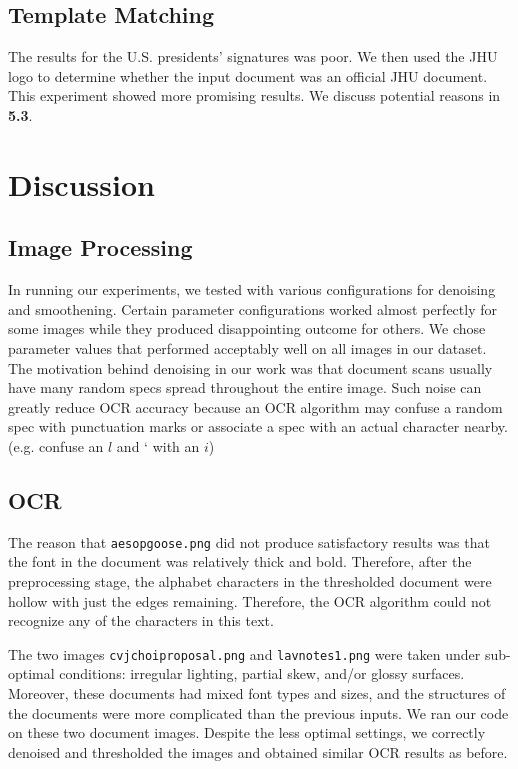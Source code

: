 \documentclass[11pt,letterpaper]{article}
\begin{document}
\subsection{Template Matching}

The results for the U.S. presidents' signatures was poor. We then used the JHU logo to determine whether the input document was an official JHU document. This experiment showed more promising results. We discuss potential reasons in \textbf{5.3}.

\section{Discussion}

\subsection{Image Processing}

In running our experiments, we tested with various configurations for denoising and smoothening. Certain parameter configurations worked almost perfectly for some images while they produced disappointing outcome for others. We chose parameter values that performed acceptably well on all images in our dataset. The motivation behind denoising in our work was that document scans usually have many random specs spread throughout the entire image. Such noise can greatly reduce OCR accuracy because an OCR algorithm may confuse a random spec with punctuation marks or associate a spec with an actual character nearby. (e.g. confuse an $l$ and ` with an $i$)

\subsection{OCR}

The reason that {\tt aesop\textunderscore goose.png} did not produce satisfactory results was that the font in the document was relatively thick and bold. Therefore, after the preprocessing stage, the alphabet characters in the thresholded document were hollow with just the edges remaining. Therefore, the OCR algorithm could not recognize any of the characters in this text.

The two images {\tt cv\textunderscore jchoi\textunderscore proposal.png} and {\tt lav\textunderscore notes1.png} were taken under sub-optimal conditions: irregular lighting, partial skew, and/or glossy surfaces. Moreover, these documents had mixed font types and sizes, and the structures of the documents were more complicated than the previous inputs. We ran our code on these two document images. Despite the less optimal settings, we correctly denoised and thresholded the images and obtained similar OCR results as before.
\end{document}
